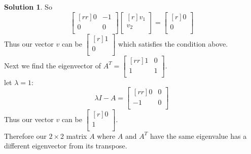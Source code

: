 \documentclass[12pt]{article}
\theoremstyle{definition}
\newtheorem*{solution}{Solution} %
\theoremstyle{plain}
\begin{document}
\begin{enumerate}
\begin{solution}
	So
	\[ \begin{bmatrix}[rr]0&-1\\0&0\\\end{bmatrix}\begin{bmatrix}[r]v_1\\v_2\\\end{bmatrix} = \begin{bmatrix}[r]0\\0\\\end{bmatrix} \]
	Thus our vector $v$ can be $\begin{bmatrix}[r]1\\0\\\end{bmatrix}$ which satisfies the condition above.\\
	Next we find the eigenvector of $A^T=\begin{bmatrix}[rr]1&0\\1&1\\\end{bmatrix}$.\\
	let $\lambda=1$:
	\[ \lambda I-A=\begin{bmatrix}[rr]0&0\\-1&0\\\end{bmatrix} \]
	Thus our vector $v$ can be $\begin{bmatrix}[r]0\\1\\\end{bmatrix}$.\\
	Therefore our $2\times 2$ matrix $A$ where $A$ and $A^T$ have the same eigenvalue has a different eigenvector from its transpose.
	\end{solution}
	

\end{enumerate}
\end{document}
